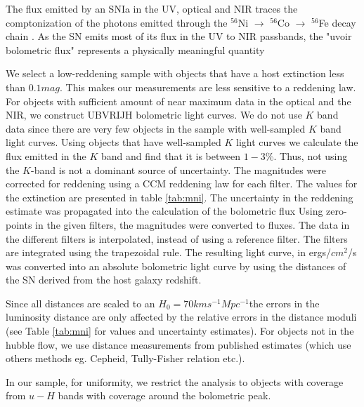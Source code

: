 The flux emitted by an SNIa in the UV, optical and NIR traces the comptonization of the photons emitted through the $^{56}$Ni $\rightarrow$  $^{56}$Co $\rightarrow$ $^{56}$Fe decay chain \citep[see][]{Nadyozhin1994}.
As the SN emits most of its flux in the UV to NIR passbands, the "uvoir bolometric flux" represents a physically meaningful quantity \citep{Suntzeff1996}

We select a low-reddening sample with objects that have a host extinction less than $0.1 mag$. This makes our measurements are less sensitive to a reddening law. 
For objects with sufficient amount of near maximum data in the optical and the NIR, we construct UBVRIJH bolometric light curves. We do not use $K$ band data since there are very few objects in the sample with well-sampled $K$ band light curves. Using  objects that have well-sampled $K$ light curves we calculate the flux emitted in the $K$ band and find that it is between $1-3 \%$. Thus, not using the $K$-band is not a dominant source of uncertainty. 
The magnitudes were corrected 
for reddening using a CCM reddening law for each filter. The values for the extinction are presented in table \ref{tab:mni}. The uncertainty in the reddening estimate
was propagated into the calculation of the bolometric flux
Using zero-points in the given filters, the magnitudes were converted to fluxes. The data in the different filters is interpolated, instead of using a reference filter. The filters are integrated using the trapezoidal rule.
The resulting light curve, in ergs/$cm^2$/s  was converted into an absolute bolometric light curve 
by using the distances of the SN derived from the host galaxy redshift. 

Since all distances are scaled to an $H_0=70 km s^{-1} Mpc ^{-1}$the errors in the luminosity distance are only affected by the relative errors in the 
distance moduli (see Table \ref{tab:mni} for values and uncertainty estimates). For objects not in the hubble flow, we use distance measurements from published estimates (which use others methods eg. Cepheid, Tully-Fisher relation etc.). 

In our sample, for uniformity, we restrict the analysis to objects with coverage from $u-H$ bands with coverage around the bolometric peak.







